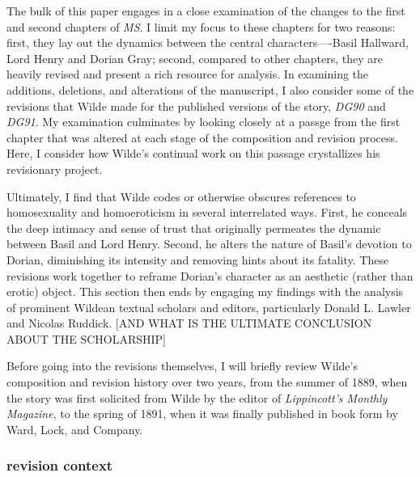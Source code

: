 \documentclass[11pt]{article}
\begin{document}
The bulk of this paper engages in a close examination of the changes
to the first and second chapters of \emph{MS}. I limit my focus to these
chapters for two reasons: first, they lay out the dynamics between the
central characters—-Basil Hallward, Lord Henry and Dorian Gray;
second, compared to other chapters, they are heavily revised and
present a rich resource for analysis. In examining the additions,
deletions, and alterations of the manuscript, I also consider some of
the revisions that Wilde made for the published versions of the story,
\emph{DG90} and \emph{DG91}. My examination culminates by looking closely at a
passge from the first chapter that was altered at each stage of the
composition and revision process. Here, I consider how Wilde’s
continual work on this passage crystallizes his revisionary project.

Ultimately, I find that Wilde codes or otherwise obscures references
to homosexuality and homoeroticism in several interrelated
ways. First, he conceals the deep intimacy and sense of trust that
originally permeates the dynamic between Basil and Lord Henry. Second,
he alters the nature of Basil’s devotion to Dorian, diminishing its
intensity and removing hints about its fatality. These revisions work
together to reframe Dorian’s character as an aesthetic (rather than
erotic) object. This section then ends by engaging my findings with
the analysis of prominent Wildean textual scholars and editors,
particularly Donald L. Lawler and Nicolas Ruddick. [AND WHAT IS THE
ULTIMATE CONCLUSION ABOUT THE SCHOLARSHIP]

Before going into the revisions themselves, I will briefly review
Wilde’s composition and revision history over two years, from the
summer of 1889, when the story was first solicited from Wilde by the
editor of \emph{Lippincott’s Monthly Magazine}, to the spring of 1891, when
it was finally published in book form by Ward, Lock, and Company.

\subsubsection{revision context}
\label{sec:orgb7711d5}
\end{document}
